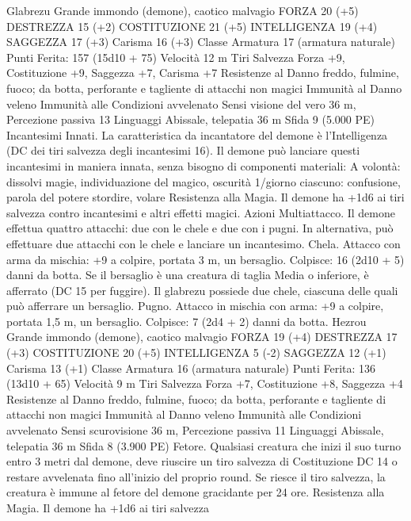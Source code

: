 \begin{multicols}{2}
Glabrezu
Grande immondo (demone), caotico malvagio
FORZA 20 (+5)
DESTREZZA 15 (+2)
COSTITUZIONE 21 (+5)
INTELLIGENZA 19 (+4)
SAGGEZZA 17 (+3)
Carisma 16 (+3)
Classe Armatura 17 (armatura naturale)
\hspace*{0pt}\hfill{Punti Ferita}: 157 (15d10 + 75)
Velocità 12 m
Tiri Salvezza Forza +9, Costituzione +9, Saggezza +7, Carisma
+7
Resistenze al Danno freddo, fulmine, fuoco; da botta,
perforante e tagliente di attacchi non magici
Immunità al Danno veleno
Immunità alle Condizioni avvelenato
Sensi visione del vero 36 m, Percezione passiva 13
Linguaggi Abissale, telepatia 36 m
Sfida 9 (5.000 PE)
Incantesimi Innati. La caratteristica da incantatore del demone è
l’Intelligenza (DC dei tiri salvezza degli incantesimi 16). Il
demone può lanciare questi incantesimi in maniera innata, senza
bisogno di componenti materiali:
A volontà: dissolvi magie, individuazione del magico, oscurità
1/giorno ciascuno: confusione, parola del potere stordire, volare
Resistenza alla Magia. Il demone ha +1d6 ai tiri salvezza
contro incantesimi e altri effetti magici.
Azioni
Multiattacco. Il demone effettua quattro attacchi: due con le
chele e due con i pugni. In alternativa, può effettuare due attacchi
con le chele e lanciare un incantesimo.
Chela. Attacco con arma da mischia: +9 a colpire, portata 3 m,
un bersaglio.
Colpisce: 16 (2d10 + 5) danni da botta. Se il bersaglio è una
creatura di taglia Media o inferiore, è afferrato (DC 15 per
fuggire). Il glabrezu possiede due chele, ciascuna delle quali può
afferrare un bersaglio.
Pugno. Attacco in mischia con arma: +9 a colpire, portata 1,5 m,
un bersaglio.
Colpisce: 7 (2d4 + 2) danni da botta.
Hezrou
Grande immondo (demone), caotico malvagio
FORZA 19 (+4)
DESTREZZA 17 (+3)
COSTITUZIONE 20 (+5)
INTELLIGENZA 5 (-2)
SAGGEZZA 12 (+1)
Carisma 13 (+1)
Classe Armatura 16 (armatura naturale)
\hspace*{0pt}\hfill{Punti Ferita}: 136 (13d10 + 65)
Velocità 9 m
Tiri Salvezza Forza +7, Costituzione +8, Saggezza +4
Resistenze al Danno freddo, fulmine, fuoco; da botta,
perforante e tagliente di attacchi non magici
Immunità al Danno veleno
Immunità alle Condizioni avvelenato
Sensi scurovisione 36 m, Percezione passiva 11
Linguaggi Abissale, telepatia 36 m
Sfida 8 (3.900 PE)
Fetore. Qualsiasi creatura che inizi il suo turno entro 3 metri dal
demone, deve riuscire un tiro salvezza di Costituzione DC 14 o
restare avvelenata fino all’inizio del proprio round. Se riesce il
tiro salvezza, la creatura è immune al fetore del demone
gracidante per 24 ore.
Resistenza alla Magia. Il demone ha +1d6 ai tiri salvezza

\end{multicols}
